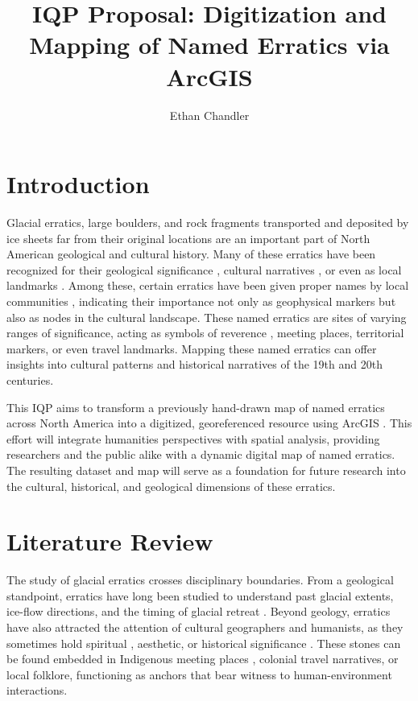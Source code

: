 \documentclass{article}
\title{IQP Proposal: Digitization and Mapping of Named Erratics via ArcGIS}
\author{Ethan Chandler}
\date{}
\begin{document}
\maketitle

\section{Introduction}
Glacial erratics, large boulders, and rock fragments transported and deposited by ice sheets far from their original locations are an important part of North American geological and cultural history. Many of these erratics have been recognized for their geological significance \cite{DARWIN1842, Bond1992, Evenson2009}, cultural narratives \cite{Hutton2013}, or even as local landmarks \cite{Hoyt1971}. Among these, certain erratics have been given proper names by local communities \cite{Martin2019}, indicating their importance not only as geophysical markers but also as nodes in the cultural landscape. These named erratics are sites of varying ranges of significance, acting as symbols of reverence \cite{Hellerstein2007}, meeting places, territorial markers, or even travel landmarks. Mapping these named erratics can offer insights into cultural patterns and historical narratives of the 19th and 20th centuries.

This IQP aims to transform a previously hand-drawn map of named erratics \cite{Hutton2012} across North America into a digitized, georeferenced resource using ArcGIS \cite{ESRI2011}. This effort will integrate humanities perspectives with spatial analysis, providing researchers and the public alike with a dynamic digital map of named erratics. The resulting dataset and map will serve as a foundation for future research into the cultural, historical, and geological dimensions of these erratics.

\section{Literature Review}
The study of glacial erratics crosses disciplinary boundaries. From a geological standpoint, erratics have long been studied to understand past glacial extents, ice-flow directions, and the timing of glacial retreat \cite{DARWIN1842, Bond1992, Evenson2009, Colgan2009, Clark2018, Emery2023}. Beyond geology, erratics have also attracted the attention of cultural geographers and humanists, as they sometimes hold spiritual \cite{Delabarre1928, Hutton2013}, aesthetic, or historical significance \cite{Hellerstein2007}. These stones can be found embedded in Indigenous meeting places \cite{Hutton2013}, colonial travel narratives, or local folklore, functioning as anchors that bear witness to human-environment interactions. 
\end{document}
